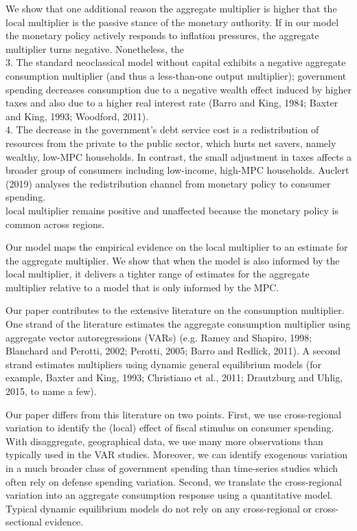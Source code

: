 \documentclass[10pt]{article}
\begin{document}
We show that one additional reason the aggregate multiplier is higher that the local multiplier is the passive stance of the monetary authority. If in our model the monetary policy actively responds to inflation pressures, the aggregate multiplier turns negative. Nonetheless, the\\
3. The standard neoclassical model without capital exhibits a negative aggregate consumption multiplier (and thus a less-than-one output multiplier); government spending decreases consumption due to a negative wealth effect induced by higher taxes and also due to a higher real interest rate (Barro and King, 1984; Baxter and King, 1993; Woodford, 2011).\\
4. The decrease in the government's debt service cost is a redistribution of resources from the private to the public sector, which hurts net savers, namely wealthy, low-MPC households. In contrast, the small adjustment in taxes affects a broader group of consumers including low-income, high-MPC households. Auclert (2019) analyses the redistribution channel from monetary policy to consumer spending.\\
local multiplier remains positive and unaffected because the monetary policy is common across regions.

Our model maps the empirical evidence on the local multiplier to an estimate for the aggregate multiplier. We show that when the model is also informed by the local multiplier, it delivers a tighter range of estimates for the aggregate multiplier relative to a model that is only informed by the MPC.

Our paper contributes to the extensive literature on the consumption multiplier. One strand of the literature estimates the aggregate consumption multiplier using aggregate vector autoregressions (VARs) (e.g. Ramey and Shapiro, 1998; Blanchard and Perotti, 2002; Perotti, 2005; Barro and Redlick, 2011). A second strand estimates multipliers using dynamic general equilibrium models (for example, Baxter and King, 1993; Christiano et al., 2011; Drautzburg and Uhlig, 2015, to name a few).

Our paper differs from this literature on two points. First, we use cross-regional variation to identify the (local) effect of fiscal stimulus on consumer spending. With disaggregate, geographical data, we use many more observations than typically used in the VAR studies. Moreover, we can identify exogenous variation in a much broader class of government spending than time-series studies which often rely on defense spending variation. Second, we translate the cross-regional variation into an aggregate consumption response using a quantitative model. Typical dynamic equilibrium models do not rely on any cross-regional or cross-sectional evidence.
\end{document}

